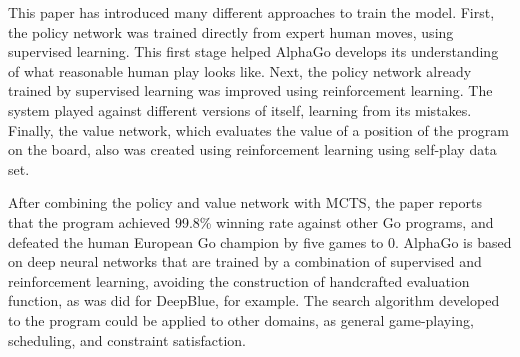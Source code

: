 \documentclass[a4paper]{article}
\begin{document}
This paper has introduced many different approaches to train the model. First, the policy network was trained directly from expert human moves, using supervised learning. This first stage helped AlphaGo develops its understanding of what reasonable human play looks like. Next, the policy network already trained by supervised learning was improved using reinforcement learning. The system played against different versions of itself, learning from its mistakes. Finally, the value network, which evaluates the value of a position of the program on the board, also was created using reinforcement learning using self-play data set.

After combining the policy and value network with MCTS, the paper reports that the program achieved 99.8\% winning rate against other Go programs, and defeated the human European Go champion by five games to 0. AlphaGo is based on deep neural networks that are trained by a combination of supervised and reinforcement learning, avoiding the construction of handcrafted evaluation function, as was did for DeepBlue, for example. The search algorithm developed to the program could be applied to other domains, as general game-playing, scheduling, and constraint satisfaction.








\end{document}
